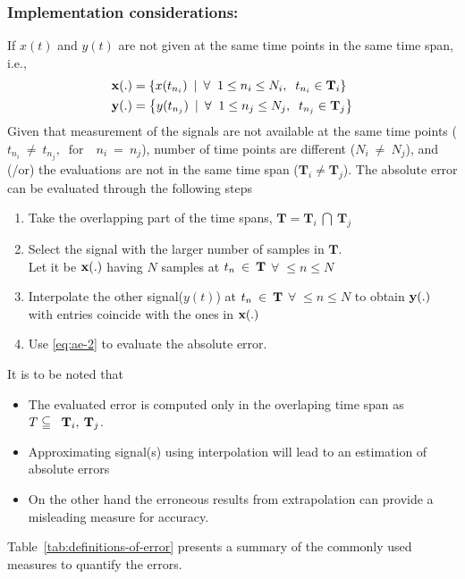 \documentclass[10pt,oneside]{article}
\begin{document}
\subsubsection*{Implementation considerations:}
If $x(t)$ and $y(t)$ are not given at the same time points in the same time span, i.e.,
\begin{align}\label{eq:sig-2}
\mathbf{x}(.)&=\left\{x(t_{n_i})\:\mid \: \forall\;\;1 \leq n_i \leq N_i ,\;\; t_{n_i}\in\mathbf{T}_i 
\right\}\\
\mathbf{y}(.)&=\left\{y(t_{n_j})\:\mid \: \forall\;\;1 \leq n_j \leq N_j ,\;\; t_{n_j}\in\mathbf{T}_j
\right\}
\end{align}
Given that measurement of the signals are not available at the same time points ($t_{n_i}\:\neq\:t_{n_j},\;\;\text{for}\quad n_i\:=\:n_j$), number of time points are different ($N_i\:\neq\:N_j$), and (/or) the evaluations are not in the same time span ($\mathbf{T}_i\neq\mathbf{T}_j$). The absolute error can be evaluated through the following steps
\begin{enumerate}
    \item Take the overlapping part of the time spans, $\mathbf{T} = \mathbf{T}_i\:\bigcap\:\mathbf{T}_j$
    \item Select the signal with the larger number of samples in $\mathbf{T}$.\\ Let it be $\mathbf{x}(.)$ having $N$ samples at $t_{n}\:\in\:\mathbf{T}$ $\forall\;\leq n \leq N$
    \item Interpolate the other signal($y(t)$) at $t_{n}\:\in\:\mathbf{T}$ $\forall\;\leq n \leq N$ to obtain $\mathbf{y}(.)$ with entries coincide with the ones in $\mathbf{x}(.)$
    \item Use \eqref{eq:ae-2} to evaluate the absolute error. 
\end{enumerate}
It is to be noted that 
\begin{itemize} \packed
    \item The evaluated error is computed only in the overlaping time span as $T\subseteqq\;\;\mathbf{T}_i,\:\mathbf{T}_j$.
    \item Approximating signal(s) using interpolation will lead to an estimation of absolute errors 
    \item On the other hand the erroneous results from extrapolation can provide a misleading measure for accuracy.
\end{itemize}


\np
Table~\ref{tab:definitions-of-error} presents a summary of the commonly used measures to quantify the errors.
\end{document}
